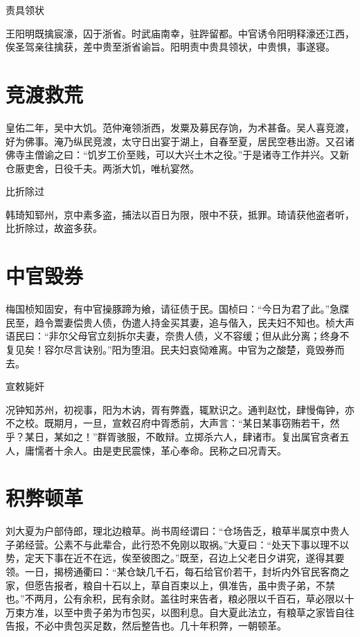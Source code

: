\documentclass[a4paper,12pt,UTF8,twoside]{ctexbook}
\begin{document}
    责具领状
    
    王阳明既擒宸濠，囚于浙省。时武庙南幸，驻跸留都。中官诱令阳明释濠还江西，俟圣驾亲往擒获，差中贵至浙省谕旨。阳明责中贵具领状，中贵惧，事遂寝。
    
    \section{竞渡救荒}
    
    皇佑二年，吴中大饥。范仲淹领浙西，发粟及募民存饷，为术甚备。吴人喜竞渡，好为佛事。淹乃纵民竞渡，太守日出宴于湖上，自春至夏，居民空巷出游。又召诸佛寺主僧谕之曰：“饥岁工价至贱，可以大兴土木之役。”于是诸寺工作并兴。又新仓厫吏舍，日役千夫。两浙大饥，唯杭宴然。
    
    比折除过
    
    韩琦知郓州，京中素多盗，捕法以百日为限，限中不获，抵罪。琦请获他盗者听，比折除过，故盗多获。
    
    \section{中官毁券}
    
    梅国桢知固安，有中官操豚蹄为飨，请征债于民。国桢曰：“今日为君了此。”急牒民至，趋令鬻妻偿贵人债，伪遣人持金买其妻，追与偕入，民夫妇不知也。桢大声语民曰：“非尔父母官立刻拆尔夫妻，奈贵人债，义不容缓；但从此分离；终身不复见矣！容尔尽言诀别。”阳为堕泪。民夫妇哀恸难离。中官为之酸楚，竟毁券而去。
    
    宣敕毙奸
    
    况钟知苏州，初视事，阳为木讷，胥有弊蠹，辄默识之。通判赵忱，肆慢侮钟，亦不之校。既期月，一旦，宣敕召府中胥悉前，大声言：“某日某事窃贿若干，然乎？某日，某如之！”群胥骇服，不敢辩。立掷杀六人，肆诸市。复出属官贪者五人，庸懦者十余人。由是吏民震悚，革心奉命。民称之曰况青天。
    
    \section{积弊顿革}
    
    刘大夏为户部侍郎，理北边粮草。尚书周经谓曰：“仓场告乏，粮草半属京中贵人子弟经营。公素不与此辈合，此行恐不免刚以取祸。”大夏曰：“处天下事以理不以势，定天下事在近不在远，俟至彼图之。”既至，召边上父老日夕讲究，遂得其要领。一日，揭榜通衢曰：“某仓缺几千石，每石给官价若干，封圻内外官民客商之家，但愿告报者，粮自十石以上，草自百束以上，俱准告，虽中贵子弟，不禁也。”不两月，公有余积，民有余财。盖往时来告者，粮必限以千百石，草必限以十万束方准，以至中贵子弟为市包买，以图利息。自大夏此法立，有粮草之家皆自往告报，不必中贵包买足数，然后整告也。几十年积弊，一朝顿革。
    
\end{document}
